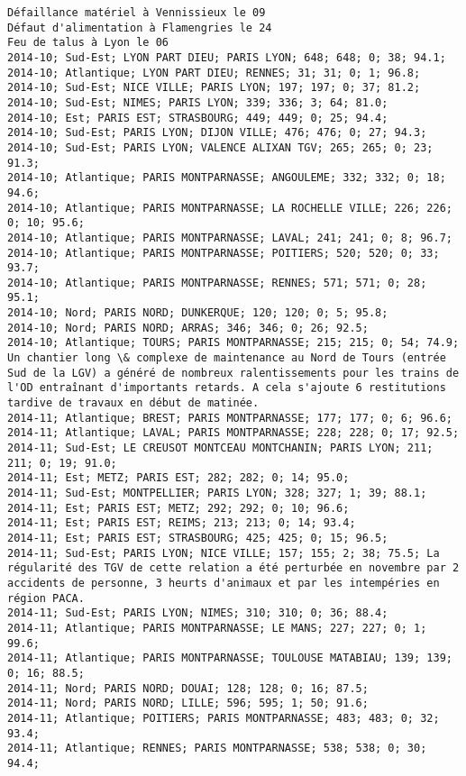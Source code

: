 \documentclass{article}
\begin{document}
\begin{Verbatim}[commandchars=\\\{\}]
Défaillance matériel à Vennissieux le 09
Défaut d'alimentation à Flamengries le 24
Feu de talus à Lyon le 06
2014-10; Sud-Est; LYON PART DIEU; PARIS LYON; 648; 648; 0; 38; 94.1; 
2014-10; Atlantique; LYON PART DIEU; RENNES; 31; 31; 0; 1; 96.8; 
2014-10; Sud-Est; NICE VILLE; PARIS LYON; 197; 197; 0; 37; 81.2; 
2014-10; Sud-Est; NIMES; PARIS LYON; 339; 336; 3; 64; 81.0; 
2014-10; Est; PARIS EST; STRASBOURG; 449; 449; 0; 25; 94.4; 
2014-10; Sud-Est; PARIS LYON; DIJON VILLE; 476; 476; 0; 27; 94.3; 
2014-10; Sud-Est; PARIS LYON; VALENCE ALIXAN TGV; 265; 265; 0; 23; 91.3; 
2014-10; Atlantique; PARIS MONTPARNASSE; ANGOULEME; 332; 332; 0; 18; 94.6; 
2014-10; Atlantique; PARIS MONTPARNASSE; LA ROCHELLE VILLE; 226; 226; 0; 10; 95.6; 
2014-10; Atlantique; PARIS MONTPARNASSE; LAVAL; 241; 241; 0; 8; 96.7; 
2014-10; Atlantique; PARIS MONTPARNASSE; POITIERS; 520; 520; 0; 33; 93.7; 
2014-10; Atlantique; PARIS MONTPARNASSE; RENNES; 571; 571; 0; 28; 95.1; 
2014-10; Nord; PARIS NORD; DUNKERQUE; 120; 120; 0; 5; 95.8; 
2014-10; Nord; PARIS NORD; ARRAS; 346; 346; 0; 26; 92.5; 
2014-10; Atlantique; TOURS; PARIS MONTPARNASSE; 215; 215; 0; 54; 74.9; Un chantier long \& complexe de maintenance au Nord de Tours (entrée Sud de la LGV) a généré de nombreux ralentissements pour les trains de l'OD entraînant d'importants retards. A cela s'ajoute 6 restitutions tardive de travaux en début de matinée.
2014-11; Atlantique; BREST; PARIS MONTPARNASSE; 177; 177; 0; 6; 96.6; 
2014-11; Atlantique; LAVAL; PARIS MONTPARNASSE; 228; 228; 0; 17; 92.5; 
2014-11; Sud-Est; LE CREUSOT MONTCEAU MONTCHANIN; PARIS LYON; 211; 211; 0; 19; 91.0; 
2014-11; Est; METZ; PARIS EST; 282; 282; 0; 14; 95.0; 
2014-11; Sud-Est; MONTPELLIER; PARIS LYON; 328; 327; 1; 39; 88.1; 
2014-11; Est; PARIS EST; METZ; 292; 292; 0; 10; 96.6; 
2014-11; Est; PARIS EST; REIMS; 213; 213; 0; 14; 93.4; 
2014-11; Est; PARIS EST; STRASBOURG; 425; 425; 0; 15; 96.5; 
2014-11; Sud-Est; PARIS LYON; NICE VILLE; 157; 155; 2; 38; 75.5; La régularité des TGV de cette relation a été perturbée en novembre par 2 accidents de personne, 3 heurts d'animaux et par les intempéries en région PACA.
2014-11; Sud-Est; PARIS LYON; NIMES; 310; 310; 0; 36; 88.4; 
2014-11; Atlantique; PARIS MONTPARNASSE; LE MANS; 227; 227; 0; 1; 99.6; 
2014-11; Atlantique; PARIS MONTPARNASSE; TOULOUSE MATABIAU; 139; 139; 0; 16; 88.5; 
2014-11; Nord; PARIS NORD; DOUAI; 128; 128; 0; 16; 87.5; 
2014-11; Nord; PARIS NORD; LILLE; 596; 595; 1; 50; 91.6; 
2014-11; Atlantique; POITIERS; PARIS MONTPARNASSE; 483; 483; 0; 32; 93.4; 
2014-11; Atlantique; RENNES; PARIS MONTPARNASSE; 538; 538; 0; 30; 94.4; 

\end{Verbatim}
\end{document}
